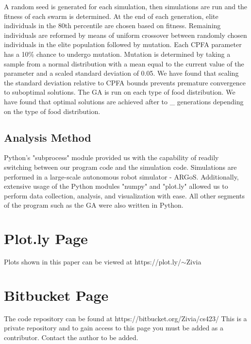 \documentclass{acm_proc_article-sp}
\begin{document}
A random seed is generated for each simulation, then simulations are run and the fitness of each swarm is determined. At the end of each generation, elite individuals in the 80th percentile are chosen based on fitness. Remaining individuals are reformed by means of uniform crossover between randomly chosen individuals in the elite population followed by mutation. Each CPFA parameter has a 10\% chance to undergo mutation. Mutation is determined by taking a sample from a normal distribution with a mean equal to the current value of the parameter and a scaled standard deviation of 0.05. We have found that scaling the standard deviation relative to CPFA bounds prevents premature convergence to suboptimal solutions. The GA is run on each type of food distribution. We have found that optimal solutions are achieved after to \_ generations depending on the type of food distribution.

\subsection{Analysis Method}

Python's "subprocess" module provided us with the capability of readily switching between our program code and the simulation code. Simulations are performed in a large-scale autonomous robot simulator - ARGoS. Additionally, extensive usage of the Python modules "numpy" and "plot.ly" allowed us to perform data collection, analysis, and visualization with ease. All other segments of the program such as the GA were also written in Python.




\appendix
\section{Plot.ly Page}\label{sec:one}
Plots shown in this paper can be viewed at https://plot.ly/$\sim$Zivia\section{Bitbucket Page}\label{sec:two}
The code repository can be found at https://bitbucket.org/Zivia/cs423/ This is a private repository and to gain access to this page you must be added as a contributor. Contact the author to be added.
\end{document}
